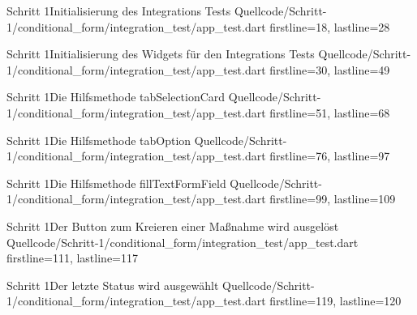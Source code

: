 \begin{alexlisting}{Schritt 1}{Initialisierung des Integrations Tests}
  {Quellcode/Schritt-1/conditional_form/integration_test/app_test.dart}
  {firstline=18, lastline=28}
  \label{lst:Schritt1IntegrationsTestInitialisierung}
\end{alexlisting}


\begin{alexlisting}{Schritt 1}{Initialisierung des Widgets für den Integrations Tests}
  {Quellcode/Schritt-1/conditional_form/integration_test/app_test.dart}
  {firstline=30, lastline=49}
  \label{lst:Schritt1IntegrationsTestWidgetInitialisierung}
\end{alexlisting}

\begin{alexlisting}{Schritt 1}{Die Hilfsmethode tabSelectionCard}
  {Quellcode/Schritt-1/conditional_form/integration_test/app_test.dart}
  {firstline=51, lastline=68}
  \label{lst:Schritt1HilfsmethodeTabSelectionCard}
\end{alexlisting}



\begin{alexlisting}{Schritt 1}{Die Hilfsmethode tabOption}
  {Quellcode/Schritt-1/conditional_form/integration_test/app_test.dart}
  {firstline=76, lastline=97}
  \label{lst:Schritt1HilfsmethodeTabOption}
\end{alexlisting}



\begin{alexlisting}{Schritt 1}{Die Hilfsmethode fillTextFormField}
  {Quellcode/Schritt-1/conditional_form/integration_test/app_test.dart}
  {firstline=99, lastline=109}
  \label{lst:Schritt1HilfsmethodeFillTextFormField}
\end{alexlisting}




\begin{alexlisting}{Schritt 1}{Der Button zum Kreieren einer Maßnahme wird ausgelöst}
  {Quellcode/Schritt-1/conditional_form/integration_test/app_test.dart}
  {firstline=111, lastline=117}
  \label{lst:Schritt1ButtonKreierenMaßnahmeAusgeloest}
\end{alexlisting}

\begin{alexlisting}{Schritt 1}{Der letzte Status wird ausgewählt}
  {Quellcode/Schritt-1/conditional_form/integration_test/app_test.dart}
  {firstline=119, lastline=120}
  \label{lst:Schritt1LetzterStatusWirdAusgewählt}
\end{alexlisting}


